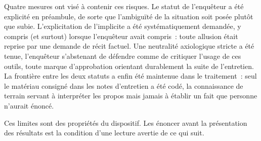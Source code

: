 Quatre mesures ont visé à contenir ces risques. Le statut de l'enquêteur a été explicité
en préambule, de sorte que l'ambiguïté de la situation soit posée plutôt que subie.
L'explicitation de l'implicite a été systématiquement demandée, y compris (et surtout)
lorsque l'enquêteur avait compris~: toute allusion était reprise par une demande de
récit factuel. Une neutralité axiologique stricte a été tenue, l'enquêteur s'abstenant
de défendre comme de critiquer l'usage de ces outils, toute marque d'approbation
orientant durablement la suite de l'entretien. La frontière entre les deux statuts a
enfin été maintenue dans le traitement~: seul le matériau consigné dans les notes
d'entretien a été codé, la connaissance de terrain servant à interpréter les propos
mais jamais à établir un fait que personne n'aurait énoncé.

Ces limites sont des propriétés du dispositif. Les énoncer avant la présentation des
résultats est la condition d'une lecture avertie de ce qui suit.